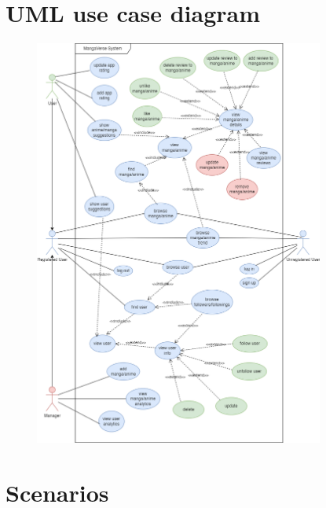 \newpage

\section{UML use case diagram}

\begin{figure}[h]\label{uml use case diagram}
    \centering
    \includegraphics[width=0.85\textwidth]{Media/use_case.png}
\end{figure}

\newpage

\section{Scenarios}

\renewcommand{\arraystretch}{1.5}
\setlength{\arrayrulewidth}{1pt} %

